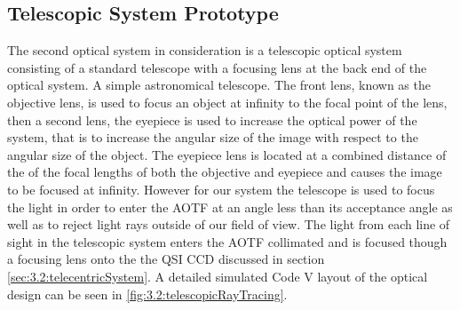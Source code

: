 \subsection{Telescopic System Prototype}

The second optical system in consideration is a telescopic optical system consisting of a standard telescope with a focusing lens at the back end of the optical system. A simple astronomical telescope. The front lens, known as the objective lens, is used to focus an object at infinity to the focal point of the lens, then a second lens, the eyepiece is used to increase the optical power of the system, that is to increase the angular size of the image with respect to the angular size of the object. The eyepiece lens is located at a combined distance of the of the focal lengths of both the objective and eyepiece and causes the image to be focused at infinity. However for our system the telescope is used to focus the light in order to enter the AOTF at an angle less than its acceptance angle as well as to reject light rays outside of our field of view. The light from each line of sight in the telescopic system enters the AOTF collimated and is focused though a focusing lens onto the the QSI CCD discussed in section \autoref{sec:3.2:telecentricSystem}. A detailed simulated Code V layout of the optical design can be seen in \autoref{fig:3.2:telescopicRayTracing}.




